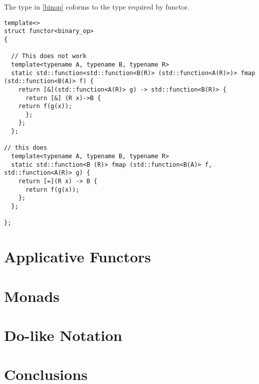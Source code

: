 \documentclass[12pt,fleqn]{article}
\begin{document}
The type in \ref{binop} coforms to the type required by functor.

\begin{lstlisting}
template<>
struct functor<binary_op>
{

  // This does not work
  template<typename A, typename B, typename R>
  static std::function<std::function<B(R)> (std::function<A(R)>)> fmap (std::function<B(A)> f) {  
    return [&](std::function<A(R)> g) -> std::function<B(R)> {
      return [&] (R x)->B {
	return f(g(x));
      };
    };
  };

// this does
  template<typename A, typename B, typename R>
  static std::function<B (R)> fmap (std::function<B(A)> f, std::function<A(R)> g) {  
    return [=](R x) -> B {
      return f(g(x));
    };
  };

};
\end{lstlisting}


\section*{Applicative Functors}

\section*{Monads}
 
\section*{Do-like Notation}
 


\section*{Conclusions}
\end{document}
